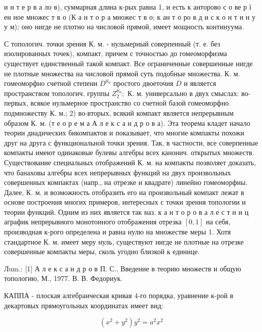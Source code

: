 \documentclass[10pt]{article}
\begin{document}
и н т е р в а ло в), суммарная длина к-рых равна 1, и есть к анторово с о ве р ї ен ное множес т в о (К а н т о р а множес т в о; к ан т о ро в д и с к о н т и н у у м); оно нигде не плотно на числовой прямой, имеет мощность континуума.



С топологич. точки зрения К. м. - нульмерный соверпенный (т. е. без изолированных точек), компакт, причем с точностью до гомеоморфизма существует единственный такой компакт. Все ограниченные совершенные нигде не плотные множества на числовой прямой суть подобные множества. К. м. гомеоморфно счетной степени $D^{\aleph_{0}}$ простого двоеточия $D$ и является пространством топологич. группы $Z_{2}^{\aleph_{0}} ;$ К. м. универсально в двух смыслах: во-первых, всякое нульмерное пространство со счетной базой гомеоморфно подмножеству К. м.; 2) во-вторых, всякий компакт является непрерывным образом К. м. (т е о р е м а А л е к с а н д р о в а). Эта теорема кладет начало теории диадических бикомпактов и показывает, что многие компакты похожи друг на друга с функциональной точки зрения. Так, в частности, все соверпенные компакты имеют одинаковые булевы алгебры всех канонич. открытых множеств. Существование специальных отображений К. м. на компакты позволяет доказать, что банаховы алгебры всех непрерывных функций на двух произвольных совершенных компактах (напр., на отрезке и квадрате) линейно гомеоморфны. Далее, К. м. и возможность отобразить его на произвольный компакт лежат в основе построения многих примеров, интересных с точки зрения топологии и теории функций. Одним из них является так наз. к а н т о р о в а л е с т н и ц аграфик непрерывного монотонного отображения отрезка $[0,1]$ на себя, производная к-рого определена и равна нулю на множестве меры 1. Хотя стандартное К. м. имеет меру нуль, существуют нигде не плотные на отрезке совершенные компакты меры, сколь угодно близкой к единице.



Лum.: [1] А л е к с а н д р о в П. С., Введение в теорию множеств и общую топологию, М., 1977. В. В. Федориук.



КАППА - плоская алгебраическая кривая 4-го порядка, уравнение к-рой в декартовых прямоугольных координатах имеет вид:



\[

\left(x^{2}+y^{2}\right) y^{2}=a^{2} x^{2}

\]
\end{document}
